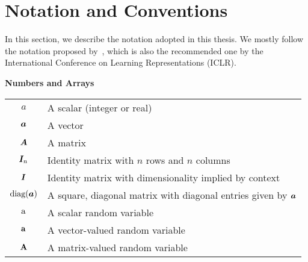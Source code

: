 \chapter*{Notation and Conventions}
\label{notation}

\newlength{\notationgap}
\setlength{\notationgap}{1pc}

In this section, we describe the notation adopted in this thesis. We mostly follow the notation proposed by~\citet{Goodfellow2016}, which is also the recommended one by the International Conference on Learning Representations (ICLR).

\vspace{\notationgap}
\begin{minipage}{\textwidth}
	\centerline{\bf Numbers and Arrays}
	\bgroup
	\def\arraystretch{1.5}
	\begin{tabular}{cp{3.25in}}
		$\displaystyle a$ & A scalar (integer or real)\\
		$\displaystyle {\bm{a}}$ & A vector\\
		$\displaystyle {\bm{A}}$ & A matrix\\
		$\displaystyle {\bm{I}}_n$ & Identity matrix with $n$ rows and $n$ columns\\
		$\displaystyle {\bm{I}}$ & Identity matrix with dimensionality implied by context\\
		$\displaystyle \text{diag}({\bm{a}})$ & A square, diagonal matrix with diagonal entries given by ${\bm{a}}$\\
		$\displaystyle {\textnormal{a}}$ & A scalar random variable\\
		$\displaystyle {\mathbf{a}}$ & A vector-valued random variable\\
		$\displaystyle {\mathbf{A}}$ & A matrix-valued random variable\\
	\end{tabular}
	\egroup
\end{minipage}

